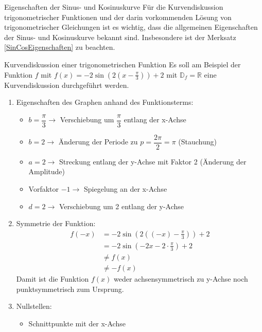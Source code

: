 \begin{b8d}{Eigenschaften der Sinus- und Kosinuskurve}{}
Für die Kurvendiskussion trigonometrischer Funktionen und der darin vorkommenden Lösung von trigonometrischer Gleichungen ist es wichtig, dass die allgemeinen Eigenschaften der Sinus- und Kosinuskurve bekannt sind. Insbesondere ist der Merksatz \ref{SinCosEigenschaften} zu beachten.
\end{b8d}
\begin{bsp}{Kurvendiskussion einer trigonometrischen Funktion}{}
Es soll am Beispiel der Funktion $f$ mit $f(x) = -2\sin{(2(x-\frac{\pi}{3}))} +2$  mit $\mathds{D}_f = \mathds{R}$ eine Kurvendiskussion durchgeführt werden.
\begin{enumerate}
\item Eigenschaften des Graphen anhand des Funktionsterms:
\begin{itemize}
    \item $b=\dfrac{\pi}{3} \longrightarrow$ Verschiebung um $\dfrac{\pi}{3}$  entlang der x-Achse
    \item $b=2 \longrightarrow$ Änderung der Periode zu $p= \dfrac{2\pi}{2} = \pi$ (Stauchung)
    \item $a = 2 \longrightarrow$ Streckung entlang der y-Achse mit Faktor 2 (Änderung der Amplitude)
    \item Vorfaktor $-1 \longrightarrow$ Spiegelung an der x-Achse
    \item $d= 2 \longrightarrow $ Verschiebung um 2 entlang der y-Achse
\end{itemize}
    \item Symmetrie der Funktion:
    \begin{equation*}
        \begin{split}
            f(-x) &=  -2\sin{(2((-x)-\frac{\pi}{3}))} +2\\
            &=  -2\sin{(-2x-2\cdot \frac{\pi}{3})} +2\\
            &\neq f(x)\\
            &\neq -f(x)
        \end{split}
    \end{equation*}
    Damit ist die Funktion $f(x)$ weder achsensymmetrisch zu y-Achse noch punktsymmetrisch zum Ursprung.
    \item Nullstellen:\begin{itemize}
        \item Schnittpunkte mit der x-Achse
    \begin{equation*}

\end{equation*}
\end{itemize}
\end{enumerate}
\end{bsp}
